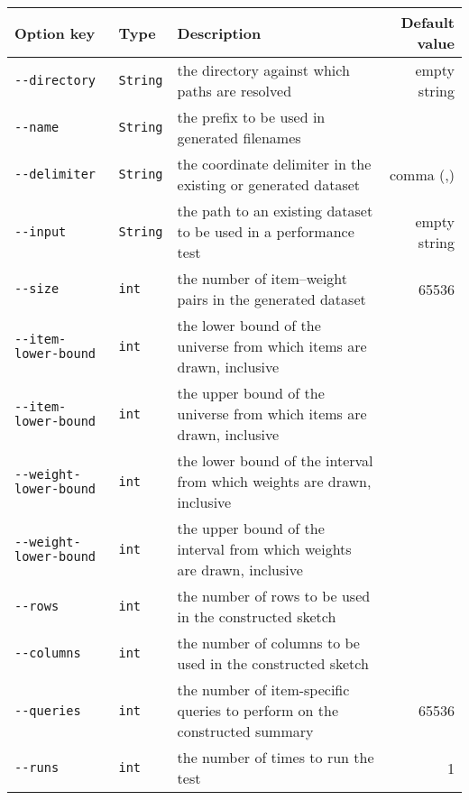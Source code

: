 \begin{tabular}{llp{6cm}r}
  \toprule
  Option key & Type & Description & Default value \\
  \midrule
  \lstinline{--directory} & \lstinline{String} & the directory against which paths are resolved & empty string \\
  \lstinline{--name} & \lstinline{String} & the prefix to be used in generated filenames & \\
  \lstinline{--delimiter} & \lstinline{String} & the coordinate delimiter in the existing or generated dataset & comma (,) \\
  \lstinline{--input} & \lstinline{String} & the path to an existing dataset to be used in a performance test & empty string \\
  \lstinline{--size} & \lstinline{int} & the number of item--weight pairs in the generated dataset & \num{65536} \\
  \lstinline{--item-lower-bound} & \lstinline{int} & the lower bound of the universe from which items are drawn, inclusive & \\
  \lstinline{--item-lower-bound} & \lstinline{int} & the upper bound of the universe from which items are drawn, inclusive & \\
  \lstinline{--weight-lower-bound} & \lstinline{int} & the lower bound of the interval from which weights are drawn, inclusive & \\
  \lstinline{--weight-lower-bound} & \lstinline{int} & the upper bound of the interval from which weights are drawn, inclusive & \\
  \lstinline{--rows} & \lstinline{int} & the number of rows to be used in the constructed sketch & \\
  \lstinline{--columns} & \lstinline{int} & the number of columns to be used in the constructed sketch & \\
  \lstinline{--queries} & \lstinline{int} & the number of item-specific queries to perform on the constructed summary & \num{65536} \\
  \lstinline{--runs} & \lstinline{int} & the number of times to run the test & \num{1} \\
  \bottomrule
\end{tabular}
